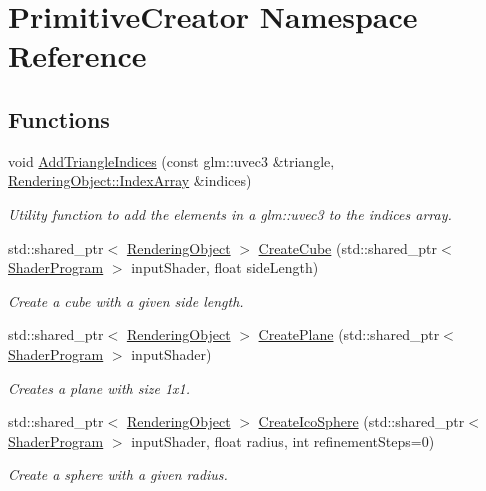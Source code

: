 \hypertarget{namespace_primitive_creator}{}\section{Primitive\+Creator Namespace Reference}
\label{namespace_primitive_creator}
\subsection*{Functions}
\begin{DoxyCompactItemize}
\item 
void \hyperlink{namespace_primitive_creator_acbc473c3e4d3b99d8e2b9d302e095978}{Add\+Triangle\+Indices} (const glm\+::uvec3 \&triangle, \hyperlink{class_rendering_object_a9931c88bca3384065c6691dfe1e60af1}{Rendering\+Object\+::\+Index\+Array} \&indices)
\begin{DoxyCompactList}\small\item\em Utility function to add the elements in a glm\+::uvec3 to the indices array. \end{DoxyCompactList}\item 
std\+::shared\+\_\+ptr$<$ \hyperlink{class_rendering_object}{Rendering\+Object} $>$ \hyperlink{namespace_primitive_creator_a4fcaafc02f9b75b4e6e9720e7c15c079}{Create\+Cube} (std\+::shared\+\_\+ptr$<$ \hyperlink{class_shader_program}{Shader\+Program} $>$ input\+Shader, float side\+Length)
\begin{DoxyCompactList}\small\item\em Create a cube with a given side length. \end{DoxyCompactList}\item 
std\+::shared\+\_\+ptr$<$ \hyperlink{class_rendering_object}{Rendering\+Object} $>$ \hyperlink{namespace_primitive_creator_a1af4816da9f64904c664718e13b05e4c}{Create\+Plane} (std\+::shared\+\_\+ptr$<$ \hyperlink{class_shader_program}{Shader\+Program} $>$ input\+Shader)
\begin{DoxyCompactList}\small\item\em Creates a plane with size 1x1. \end{DoxyCompactList}\item 
std\+::shared\+\_\+ptr$<$ \hyperlink{class_rendering_object}{Rendering\+Object} $>$ \hyperlink{namespace_primitive_creator_afbeed51ca2c797399acd7b582ce91139}{Create\+Ico\+Sphere} (std\+::shared\+\_\+ptr$<$ \hyperlink{class_shader_program}{Shader\+Program} $>$ input\+Shader, float radius, int refinement\+Steps=0)
\begin{DoxyCompactList}\small\item\em Create a sphere with a given radius. \end{DoxyCompactList}\end{DoxyCompactItemize}


